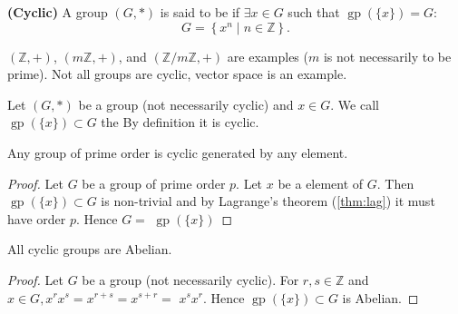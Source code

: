 \documentclass{article}
\newcommand{\bfs}[1]{\textbf{({#1}) }}
\newcommand{\gp}{\operatorname{gp}}
\begin{document}
\begin{defa}{\bfs{Cyclic}}
     A group $(G, *)$ is said to be  if $\exists x \in G$ such that $\gp(\{x\})=G$:
     $$G=\left\{x^{n} \mid n \in \mathbb{Z}\right\} .$$
\end{defa}
\begin{rema}
$(\mathbb{Z},+)$, $(m\mathbb{Z},+)$, and $(\mathbb{Z} / m \mathbb{Z},+)$ are examples ($m$ is not necessarily to be prime). Not all groups are cyclic, vector space is an example.
\end{rema}
\begin{rema}
Let $(G, *)$ be a group (not necessarily cyclic) and $x \in G$.  We call $\gp(\{x\}) \subset G$ the  By definition it is cyclic.
\end{rema}
\begin{lema}\label{lem:iondfdagtv}
Any group of prime order is cyclic generated by any  element.
\end{lema}
\begin{proof}
Let $G$ be a group of prime order $p$. Let $x$ be a  element of $G$. Then $\gp(\{x\}) \subset G$ is non-trivial and by Lagrange's theorem (\cref{thm:lag}) it must have order $p .$ Hence $G=$ $\gp(\{x\})$
\end{proof}
\begin{lema}\label{lem:indadf}
All cyclic groups are Abelian.
\end{lema}
\begin{proof}
Let $G$ be a group (not necessarily cyclic). For $r, s \in \mathbb{Z}$ and $x \in G, x^{r} x^{s}=x^{r+s}=x^{s+r}=$ $x^{s} x^{r}$. Hence $\gp(\{x\}) \subset G$ is Abelian.
\end{proof} 
\end{document}
